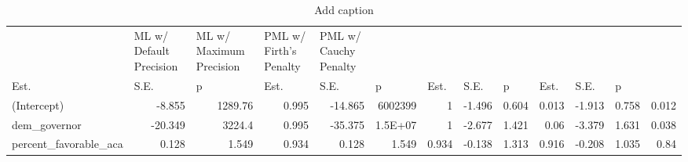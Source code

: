 \documentclass[
]{article}
\begin{document}
\begin{table}[htbp]
  \centering
  \caption{Add caption}
    \begin{tabular}{lrrrrrrrrrrrr}
    \textcolor[rgb]{ .2,  .2,  .2}{} & \multicolumn{1}{l}{\textcolor[rgb]{ .2,  .2,  .2}{ML w/ Default Precision}} & \multicolumn{1}{l}{\textcolor[rgb]{ .2,  .2,  .2}{ML w/ Maximum Precision}} & \multicolumn{1}{l}{\textcolor[rgb]{ .2,  .2,  .2}{PML w/ Firth's Penalty}} & \multicolumn{1}{l}{\textcolor[rgb]{ .2,  .2,  .2}{PML w/ Cauchy Penalty}} &       &       &       &       &       &       &       &  \\
    \textcolor[rgb]{ .2,  .2,  .2}{Est.} & \multicolumn{1}{l}{\textcolor[rgb]{ .2,  .2,  .2}{S.E.}} & \multicolumn{1}{l}{\textcolor[rgb]{ .2,  .2,  .2}{p}} & \multicolumn{1}{l}{\textcolor[rgb]{ .2,  .2,  .2}{Est.}} & \multicolumn{1}{l}{\textcolor[rgb]{ .2,  .2,  .2}{S.E.}} & \multicolumn{1}{l}{\textcolor[rgb]{ .2,  .2,  .2}{p}} & \multicolumn{1}{l}{\textcolor[rgb]{ .2,  .2,  .2}{Est.}} & \multicolumn{1}{l}{\textcolor[rgb]{ .2,  .2,  .2}{S.E.}} & \multicolumn{1}{l}{\textcolor[rgb]{ .2,  .2,  .2}{p}} & \multicolumn{1}{l}{\textcolor[rgb]{ .2,  .2,  .2}{Est.}} & \multicolumn{1}{l}{\textcolor[rgb]{ .2,  .2,  .2}{S.E.}} & \multicolumn{1}{l}{\textcolor[rgb]{ .2,  .2,  .2}{p}} &  \\
    \textcolor[rgb]{ .2,  .2,  .2}{(Intercept)} & \textcolor[rgb]{ .2,  .2,  .2}{-8.855} & \textcolor[rgb]{ .2,  .2,  .2}{1289.76} & \textcolor[rgb]{ .2,  .2,  .2}{0.995} & \textcolor[rgb]{ .2,  .2,  .2}{-14.865} & \textcolor[rgb]{ .2,  .2,  .2}{6002399} & \textcolor[rgb]{ .2,  .2,  .2}{1} & \textcolor[rgb]{ .2,  .2,  .2}{-1.496} & \textcolor[rgb]{ .2,  .2,  .2}{0.604} & \textcolor[rgb]{ .2,  .2,  .2}{0.013} & \textcolor[rgb]{ .2,  .2,  .2}{-1.913} & \textcolor[rgb]{ .2,  .2,  .2}{0.758} & \textcolor[rgb]{ .2,  .2,  .2}{0.012} \\
    \textcolor[rgb]{ .2,  .2,  .2}{dem\_governor} & \textcolor[rgb]{ .2,  .2,  .2}{-20.349} & \textcolor[rgb]{ .2,  .2,  .2}{3224.4} & \textcolor[rgb]{ .2,  .2,  .2}{0.995} & \textcolor[rgb]{ .2,  .2,  .2}{-35.375} & \textcolor[rgb]{ .2,  .2,  .2}{1.5E+07} & \textcolor[rgb]{ .2,  .2,  .2}{1} & \textcolor[rgb]{ .2,  .2,  .2}{-2.677} & \textcolor[rgb]{ .2,  .2,  .2}{1.421} & \textcolor[rgb]{ .2,  .2,  .2}{0.06} & \textcolor[rgb]{ .2,  .2,  .2}{-3.379} & \textcolor[rgb]{ .2,  .2,  .2}{1.631} & \textcolor[rgb]{ .2,  .2,  .2}{0.038} \\
    \textcolor[rgb]{ .2,  .2,  .2}{percent\_favorable\_aca} & \textcolor[rgb]{ .2,  .2,  .2}{0.128} & \textcolor[rgb]{ .2,  .2,  .2}{1.549} & \textcolor[rgb]{ .2,  .2,  .2}{0.934} & \textcolor[rgb]{ .2,  .2,  .2}{0.128} & \textcolor[rgb]{ .2,  .2,  .2}{1.549} & \textcolor[rgb]{ .2,  .2,  .2}{0.934} & \textcolor[rgb]{ .2,  .2,  .2}{-0.138} & \textcolor[rgb]{ .2,  .2,  .2}{1.313} & \textcolor[rgb]{ .2,  .2,  .2}{0.916} & \textcolor[rgb]{ .2,  .2,  .2}{-0.208} & \textcolor[rgb]{ .2,  .2,  .2}{1.035} & \textcolor[rgb]{ .2,  .2,  .2}{0.84} \\

\end{tabular}
\end{table}
\end{document}
